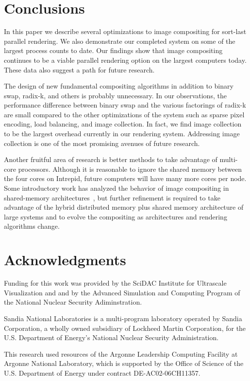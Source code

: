 \documentclass{acm_proc_article-sp}
\newcommand*{\lcite}[1]{~\cite{#1}}
\begin{document}
\section{Conclusions}
\label{sec:Conclusions}

In this paper we describe several optimizations to image compositing for
sort-last parallel rendering.  We also demonstrate our completed system on
some of the largest process counts to date.  Our findings show that image
compositing continues to be a viable parallel rendering option on the
largest computers today.  These data also suggest a path for future
research.

The design of new fundamental compositing algorithms in addition to binary
swap, radix-k, and others is probably unnecessary.  In our observations,
the performance difference between binary swap and the various factorings
of radix-k are small compared to the other optimizations of the system such
as sparse pixel encoding, load balancing, and image collection.  In fact,
we find image collection to be the largest overhead currently in our
rendering system.  Addressing image collection is one of the most promising
avenues of future research.

Another fruitful area of research is better methods to take advantage of
multi-core processors.  Although it is reasonable to ignore the shared
memory between the four cores on Intrepid, future computers will have many
more cores per node.  Some introductory work has analyzed the behavior of
image compositing in shared-memory
architectures\lcite{Howison2010,Nouanesengsy2011,Reinhard2000,Peterka2008},
but further refinement is required to take advantage of the hybrid
distributed memory plus shared memory architecture of large systems and to
evolve the compositing as architectures and rendering algorithms change.

\section{Acknowledgments}

Funding for this work was provided by the SciDAC Institute for Ultrascale
Visualization and and by the Advanced Simulation and Computing Program of
the National Nuclear Security Adiminstration.

Sandia National Laboratories is a multi-program laboratory operated by
Sandia Corporation, a wholly owned subsidiary of Lockheed Martin
Corporation, for the U.S. Department of Energy's National Nuclear Security
Administration.

This research used resources of the Argonne Leadership Computing Facility
at Argonne National Laboratory, which is supported by the Office of Science
of the U.S. Department of Energy under contract DE-AC02-06CH11357.



\end{document}
